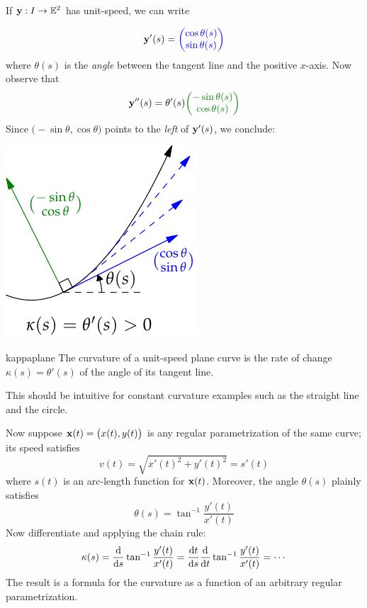 If $\vy:I\to\E^2$ has unit-speed, we can write\par
\begin{minipage}[t]{0.72\linewidth}\vspace{-12pt}
	\[
		\vy'(s)=\textcolor{blue}{\twovec{\cos\theta(s)}{\sin\theta(s)}}
	\]
	where $\theta(s)$ is the \emph{angle} between the tangent line and the positive $x$-axis. Now observe that
	\[
		\vy''(s)=\theta'(s)\textcolor{Green}{\twovec{-\sin\theta(s)}{\cos\theta(s)}}
	\]
	Since $\bigl(-\sin\theta,\cos\theta\bigr)$ points to the \emph{left} of $\vy'(s)$, we conclude:
\end{minipage}
\hfill
\begin{minipage}[t]{0.27\linewidth}\vspace{-8pt}
	\flushright \includegraphics[scale=0.95]{regular-planekappa}
\end{minipage}\par


\begin{thm}{}{kappaplane}
	The curvature of a unit-speed plane curve is the rate of change $\kappa(s)=\theta'(s)$ of the angle of its tangent line.
\end{thm}

This should be intuitive for constant curvature examples such as the straight line and the circle.

\goodbreak

Now suppose $\vx(t)=\bigl(x(t),y(t)\bigr)$ is any regular parametrization of the same curve; its speed satisfies
\[
	v(t)=\sqrt{x'(t)^2+y'(t)^2}=s'(t)
\]
where $s(t)$ is an arc-length function for $\vx(t)$. Moreover, the angle $\theta(s)$ plainly satisfies
\[
	\theta(s)=\tan^{-1}\frac{y'(t)}{x'(t)}
\]
Now differentiate and applying the chain rule:
\[
	\kappa(s)=\diff s\tan^{-1}\frac{y'(t)}{x'(t)} =\diff[t]{s}\diff t\tan^{-1}\frac{y'(t)}{x'(t)} =\cdots
\]
The result is a formula for the curvature as a function of an arbitrary regular parametrization.

